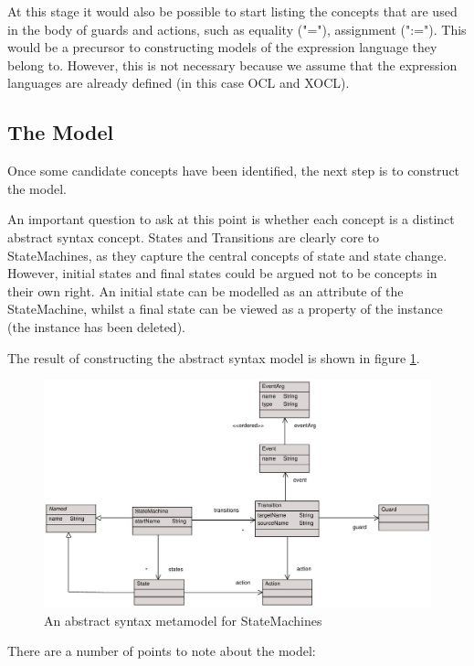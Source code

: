 At this stage it would also be possible to start listing the
concepts that are used in the body of guards and actions, such as
equality ("="), assignment (":="). This would be a precursor to
constructing models of the expression language they belong to.
However, this is not necessary because we assume that the
expression languages are already defined (in this case OCL and
XOCL).

\subsection{The Model}

Once some candidate concepts have been identified, the next step
is to construct the model.

An important question to ask at this point is whether each concept
is a distinct abstract syntax concept. States and Transitions are
clearly core to StateMachines, as they capture the central concepts
of state and state change. However, initial states and final states
could be argued not to be concepts in their own right. An initial
state can be modelled as an attribute of the StateMachine, whilst a
final state can be viewed as a property of the instance (the
instance has been deleted).

The result of constructing the abstract syntax model is shown in
figure \ref{stmabs1}.

\begin{figure}[htb]
\begin{center}
\includegraphics[width=16cm]{AbstractSyntax/figures/SMAbs1.pdf}
\caption{An abstract syntax metamodel for StateMachines}
\label{stmabs1}
\end{center}
\end{figure}

There are a number of points to note about the model:

